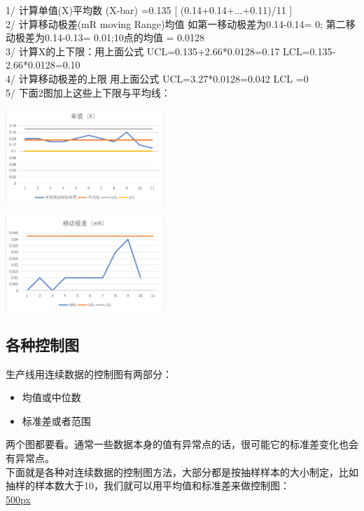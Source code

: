 1/ 计算单值(X)平均数 (X-bar) =0.135 {[} (0.14+0.14+...+0.11)/11 {]}\\
2/ 计算移动极差(mR moving Range)均值 如第一移动极差为0.14-0.14= 0;
第二移动极差为0.14-0.13= 0.01;10点的均值 = 0.0128\\
3/ 计算X的上下限：用上面公式 UCL=0.135+2.66*0.0128=0.17
LCL=0.135-2.66*0.0128=0.10\\
4/ 计算移动极差的上限 用上面公式 UCL=3.27*0.0128=0.042 LCL =0\\
5/ 下面2图加上这些上下限与平均线：


\includegraphics[width=6cm]{微信截图_20210927084548.png}


\includegraphics[width=6cm]{微信截图_20210927084434.png}

\hypertarget{ux5404ux79cdux63a7ux5236ux56fe}{%
\subsection{各种控制图}\label{ux5404ux79cdux63a7ux5236ux56fe}}

生产线用连续数据的控制图有两部分：

\begin{itemize}
\tightlist
\item
  均值或中位数
\item
  标准差或者范围
\end{itemize}

两个图都要看。通常一些数据本身的值有异常点的话，很可能它的标准差变化也会有异常点。\\
下面就是各种对连续数据的控制图方法，大部分都是按抽样样本的大小制定，比如抽样的样本数大于10，我们就可以用平均值和标准差来做控制图：\\
\href{文件:控制图01.png}{500px}


